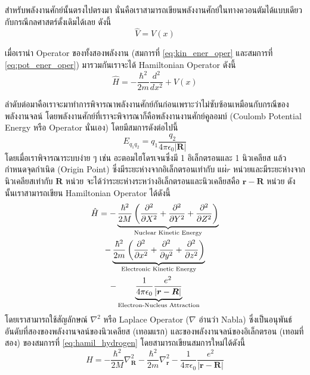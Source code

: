 สำหรับพลังงานศักย์นั้นตรงไปตรงมา นั่นคือเราสามารถเขียนพลังงานศักย์ในทางควอนตัมได้แบบเดียวกับกรณีกลศาสตร์ดั้งเดิมได้เลย ดังนี้
%
\begin{equation}\label{eq:pot_ener_oper}
    \hat{V} = V(x)
\end{equation}

เมื่อเรานำ Operator ของทั้งสองพลังงาน (สมการที่ \eqref{eq:kin_ener_oper} และสมการที่ \eqref{eq:pot_ener_oper}) มารวมกันเราจะได้ Hamiltonian Operator ดังนี้
%
\begin{equation}
    \hat{H} = -\frac{\hbar^{2}}{2m}\frac{d^{2}}{dx^{2}} + V(x)
\end{equation}

ลำดับต่อมาคือเราจะมาทำการพิจารณาพลังงานศักย์กันก่อนเพราะว่าไม่ซับซ้อนเหมือนกับกรณีของพลังงานจลน์ โดยพลังงานศักย์ที่เราจะพิจารณาก็คือพลังงานงานศักย์คูลอมบ์ (Coulomb Potential Energy หรือ Operator นั่นเอง) โดยมีสมการดังต่อไปนี้ 
%
\begin{equation}
    E_{q_{1}q_{2}} = q_{1}\frac{q_{2}}{4\pi\epsilon_{0}|\bm{R}|}
\end{equation}
%
โดยเมื่อเราพิจารณาระบบง่าย ๆ เช่น อะตอมไฮโดรเจนซึ่งมี 1 อิเล็กตรอนและ 1 นิวเคลียส แล้วกำหนดจุดกำเนิด (Origin Point) ซึ่งมีระยะห่างจากอิเล็กตรอนเท่ากับ $แผ่{r}$ หน่วยและมีระยะห่างจากนิวเคลียสเท่ากับ $\bm{R}$ หน่วย จะได้ว่าระยะห่างระหว่างอิเล็กตรอนและนิวเคลียสคือ $\bm{r}-\bm{R}$ หน่วย ดังนั้นเราสามารถเขียน Hamiltonian Operator ได้ดังนี้
%
\begin{multline}\label{eq:hamil_hydrogen}
    \hat{H} = -\underbrace{\frac{\hbar^{2}}{2M} \left( \pdv[2]{X} + \pdv[2]{Y} + \pdv[2]{Z} \right)}_{\text{Nuclear Kinetic Energy}}
    \\
    -\underbrace{\frac{\hbar^{2}}{2m} \left( \pdv[2]{x} + \pdv[2]{y} + \pdv[2]{z} \right)}_{\text{Electronic Kinetic Energy}}
    \\
    -\underbrace{\frac{1}{4\pi\epsilon_{0}}\frac{e^{2}}{|\bm{r}-\bm{R}|}}_{\text{Electron-Nucleus Attraction}}
\end{multline}
%
\noindent โดยเราสามารถใช้สัญลักษณ์ $\nabla^{2}$ หรือ Laplace Operator ($\nabla$ อ่านว่า Nabla) ซึ่งเป็นอนุพันธ์อันดับที่สองของพลังงานจลน์ของนิวเคลียส (เทอมแรก) และของพลังงานจลน์ของอิเล็กตรอน (เทอมที่สอง) ของสมการที่ \eqref{eq:hamil_hydrogen} โดยสามารถเขียนสมการใหม่ได้ดังนี้
%
\begin{equation}\label{eq:hamil_reduced}
    \hat{H} 
    = 
    -\frac{\hbar^{2}}{2M} \nabla^{2}_{\bm{R}} - \frac{\hbar^{2}}{2m} \nabla^{2}_{\bm{r}}
    -\frac{1}{4\pi\epsilon_{0}}\frac{e^{2}}{|\bm{r}-\bm{R}|}
\end{equation}


